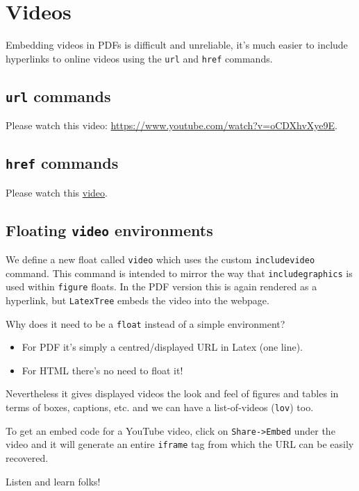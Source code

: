 
\section{Videos}
Embedding videos in PDFs is difficult and unreliable, it's much easier to include hyperlinks to online videos using the \texttt{url} and \texttt{href} commands.

\subsection{\texttt{url} commands}
Please watch this video: \url{https://www.youtube.com/watch?v=oCDXhvXye9E}.

\subsection{\texttt{href} commands}
Please watch this \href{https://www.youtube.com/watch?v=oCDXhvXye9E}{video}.

\subsection{Floating \texttt{video} environments}
We define a new float called {\tt video} which uses the custom {\tt includevideo} command. This command is intended to mirror the way that {\tt includegraphics} is used within {\tt figure} floats. In the PDF version this is again rendered as a hyperlink, but {\tt LatexTree} embeds the video into the webpage.

Why does it need to be a {\tt float} instead of a simple environment?
\begin{itemize}
\item For PDF it's simply a centred/displayed URL in Latex (one line).
\item For HTML there's no need to float it!
\end{itemize}
Nevertheless it gives displayed videos the look and feel of figures and tables in terms of boxes, captions, etc. and we can have a list-of-videos ({\tt lov}) too.

To get an embed code for a YouTube video, click on {\tt Share->Embed} under the video and it will generate an entire {\tt iframe} tag from which the URL can be easily recovered.

\begin{video}
\centering
{}
\caption{Listen and learn folks!\label{vid:orange}}
\end{video}

